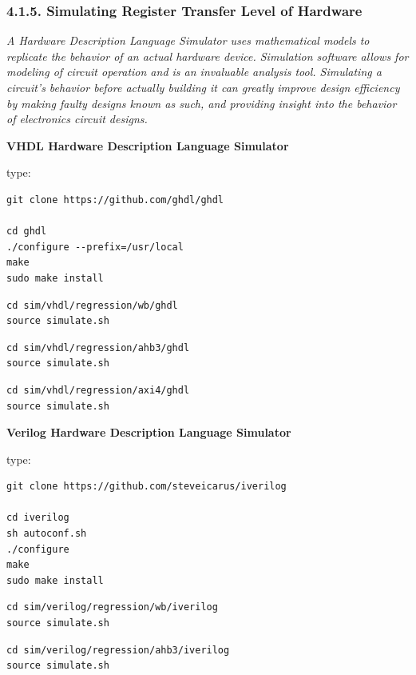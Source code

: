 \documentclass[
]{article}
\begin{document}
\hypertarget{simulating-register-transfer-level-of-hardware-1}{%
\subsubsection{4.1.5. Simulating Register Transfer Level of
Hardware}\label{simulating-register-transfer-level-of-hardware-1}}

\emph{A Hardware Description Language Simulator uses mathematical models
to replicate the behavior of an actual hardware device. Simulation
software allows for modeling of circuit operation and is an invaluable
analysis tool. Simulating a circuit's behavior before actually building
it can greatly improve design efficiency by making faulty designs known
as such, and providing insight into the behavior of electronics circuit
designs.}

\textbf{VHDL Hardware Description Language Simulator}

type:

\begin{verbatim}
git clone https://github.com/ghdl/ghdl

cd ghdl
./configure --prefix=/usr/local
make
sudo make install
\end{verbatim}

\begin{verbatim}
cd sim/vhdl/regression/wb/ghdl
source simulate.sh
\end{verbatim}

\begin{verbatim}
cd sim/vhdl/regression/ahb3/ghdl
source simulate.sh
\end{verbatim}

\begin{verbatim}
cd sim/vhdl/regression/axi4/ghdl
source simulate.sh
\end{verbatim}

\textbf{Verilog Hardware Description Language Simulator}

type:

\begin{verbatim}
git clone https://github.com/steveicarus/iverilog

cd iverilog
sh autoconf.sh
./configure
make
sudo make install
\end{verbatim}

\begin{verbatim}
cd sim/verilog/regression/wb/iverilog
source simulate.sh
\end{verbatim}

\begin{verbatim}
cd sim/verilog/regression/ahb3/iverilog
source simulate.sh
\end{verbatim}
\end{document}
